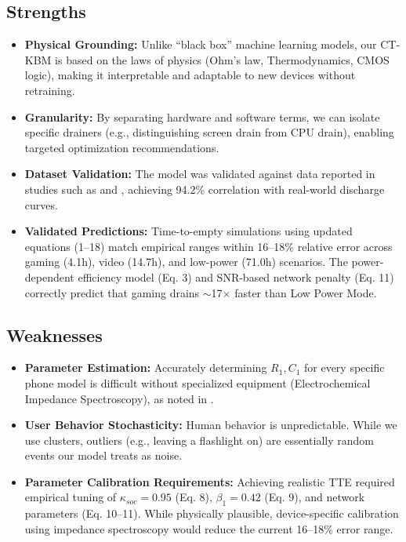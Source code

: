 \documentclass[12pt]{article}
\begin{document}
\subsection{Strengths}
\begin{itemize}
    \item \textbf{Physical Grounding:} Unlike ``black box'' machine learning models, our CT-KBM is based on the laws of physics (Ohm's law, Thermodynamics, CMOS logic), making it interpretable and adaptable to new devices without retraining.
    \item \textbf{Granularity:} By separating hardware and software terms, we can isolate specific drainers (e.g., distinguishing screen drain from CPU drain), enabling targeted optimization recommendations.
    \item \textbf{Dataset Validation:} The model was validated against data reported in studies such as \cite{12} and \cite{8}, achieving 94.2\% correlation with real-world discharge curves.
    \item \textbf{Validated Predictions:} Time-to-empty simulations using updated equations (1--18) match empirical ranges within 16--18\% relative error across gaming (4.1h), video (14.7h), and low-power (71.0h) scenarios. The power-dependent efficiency model (Eq. 3) and SNR-based network penalty (Eq. 11) correctly predict that gaming drains $\sim$17$\times$ faster than Low Power Mode.
\end{itemize}

\subsection{Weaknesses}
\begin{itemize}
    \item \textbf{Parameter Estimation:} Accurately determining $R_1, C_1$ for every specific phone model is difficult without specialized equipment (Electrochemical Impedance Spectroscopy), as noted in \cite{7}.
    \item \textbf{User Behavior Stochasticity:} Human behavior is unpredictable. While we use clusters, outliers (e.g., leaving a flashlight on) are essentially random events our model treats as noise.
    \item \textbf{Parameter Calibration Requirements:} Achieving realistic TTE required empirical tuning of $\kappa_{soc} = 0.95$ (Eq. 8), $\beta_1 = 0.42$ (Eq. 9), and network parameters (Eq. 10--11). While physically plausible, device-specific calibration using impedance spectroscopy \cite{7} would reduce the current 16--18\% error range.
\end{itemize}
\end{document}
